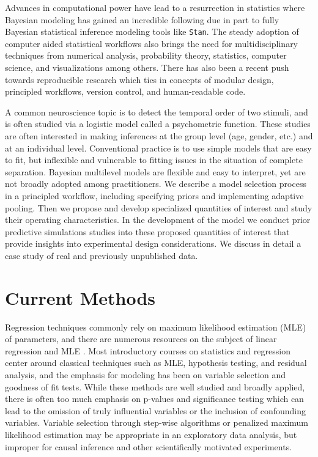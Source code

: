 \documentclass[11pt, oneside, openany]{scrbook}
\begin{document}
Advances in computational power have lead to a resurrection in statistics where Bayesian modeling has gained an incredible following due in part to fully Bayesian statistical inference modeling tools like \texttt{Stan}. The steady adoption of computer aided statistical workflows also brings the need for multidisciplinary techniques from numerical analysis, probability theory, statistics, computer science, and visualizations among others. There has also been a recent push towards reproducible research which ties in concepts of modular design, principled workflows, version control, and human-readable code.

A common neuroscience topic is to detect the temporal order of two stimuli, and is often studied via a logistic model called a psychometric function. These studies are often interested in making inferences at the group level (age, gender, etc.) and at an individual level. Conventional practice is to use simple models that are easy to fit, but inflexible and vulnerable to fitting issues in the situation of complete separation. Bayesian multilevel models are flexible and easy to interpret, yet are not broadly adopted among practitioners. We describe a model selection process in a principled workflow, including specifying priors and implementing adaptive pooling. Then we propose and develop specialized quantities of interest and study their operating characteristics. In the development of the model we conduct prior predictive simulations studies into these proposed quantities of interest that provide insights into experimental design considerations. We discuss in detail a case study of real and previously unpublished data.

\hypertarget{current-methods}{%
\section{Current Methods}\label{current-methods}}

Regression techniques commonly rely on maximum likelihood estimation (MLE) of parameters, and there are numerous resources on the subject of linear regression and MLE \citep{johnson2002applied, larsen2005introduction, sheather2009modern, navidi2015statistics}. Most introductory courses on statistics and regression center around classical techniques such as MLE, hypothesis testing, and residual analysis, and the emphasis for modeling has been on variable selection and goodness of fit tests. While these methods are well studied and broadly applied, there is often too much emphasis on p-values and significance testing which can lead to the omission of truly influential variables or the inclusion of confounding variables. Variable selection through step-wise algorithms or penalized maximum likelihood estimation \citep{hoerl1970ridge, tibshirani1996regression} may be appropriate in an exploratory data analysis, but improper for causal inference and other scientifically motivated experiments.
\end{document}
